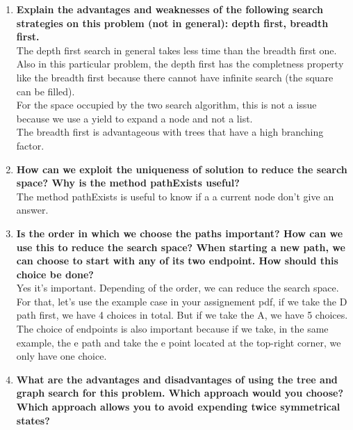 \documentclass[10pt,a4paper]{article}
\begin{document}
\begin{enumerate}
	
	\item \textbf{ Explain the advantages and weaknesses of the following search strategies on this problem (not in general): depth first, breadth first.} \\
	
	The depth first search in general takes less time than the breadth first one. Also in this particular problem, the depth first has the completness property like the breadth first because there cannot have infinite search (the square can be filled). \\
	
	For the space occupied by the two search algorithm, this is not a issue because we use a yield to expand a node and not a list. \\
	
	The breadth first is advantageous with trees that have a high branching factor.
	
	\item \textbf{How can we exploit the uniqueness of solution to reduce the search space? Why is the method pathExists useful?} \\
	
	The method pathExists is useful to know if a a current node don't give an answer. \\
	
	
	\item \textbf{Is the order in which we choose the paths important? How can we use this to reduce the search space? When starting a new path, we can choose to start with any of its two endpoint. How should this choice be done?} \\
	
	Yes it's important. Depending of the order, we can reduce the search space. For that, let's use the example case in your assignement pdf, if we take the D path first, we have 4 choices in total. But if we take the A, we have 5 choices. \\
	
	The choice of endpoints is also important because if we take, in the same example, the e path and take the e point located at the top-right corner, we only have one choice. \\
	
	
	\item \textbf{What are the advantages and disadvantages of using the tree and graph search for this problem. Which approach would you choose? Which approach allows you to avoid expending twice symmetrical states?} \\
	

\end{enumerate}
\end{document}
